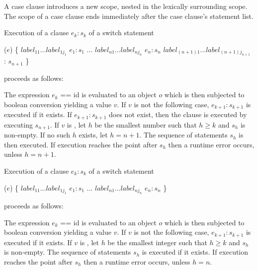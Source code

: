\documentclass{article}
\newcommand{\code}[1]{{\sf #1}}
\begin{document}
\begin{itemize}
\LMHash{}
A case clause introduces a new scope, nested in the lexically surrounding scope. The scope of a case clause ends immediately after the case clause's statement list.

\LMHash{}
Execution of a \CASE{} clause \CASE{} $e_{k}: s_{k}$ of a  switch statement

\begin{dartCode}
\SWITCH{} ($e$) \{
   $label_{11} \ldots label_{1j_1}$ \CASE{} $e_1: s_1$
   $\ldots$
   $label_{n1} \ldots label_{nj_n}$ \CASE{} $e_n: s_n$
   $label_{(n+1)1} \ldots label_{(n+1)j_{n+1}}$ \DEFAULT{}: $s_{n+1}$
\}
\end{dartCode}

proceeds as follows:

\LMHash{}
The expression \code{$e_k$ == id} is evaluated to an object $o$ which is then subjected to boolean conversion yielding a value $v$.
If $v$ is not  \TRUE{} the following case,  \CASE{} $e_{k+1}: s_{k+1}$ is executed if it exists. If  \CASE{} $e_{k+1}: s_{k+1}$ does not exist, then the \DEFAULT{} clause is executed by executing $s_{n+1}$.
If $v$ is \TRUE{},   let $h$ be the smallest number such that $h \ge k$ and $s_h$ is non-empty. If no such $h$ exists, let $h = n + 1$. The  sequence of statements $s_h$ is then executed.
If execution reaches the point after $s_h$  then  a runtime error occurs, unless $h = n+1$.

\LMHash{}
Execution of a \CASE{} clause \CASE{} $e_{k}: s_{k}$ of a  switch statement

\begin{dartCode}
\SWITCH{} ($e$) \{
   $label_{11} \ldots label_{1j_1}$ \CASE{} $e_1: s_1$
   $\ldots$
   $label_{n1} \ldots label_{nj_n}$ \CASE{} $e_n: s_n$
\}
\end{dartCode}

proceeds as follows:

\LMHash{}
The expression \code{$e_k$ == id} is evaluated to an object $o$ which is then subjected to boolean conversion yielding a value $v$.
If $v$ is not  \TRUE{} the following case,  \CASE{} $e_{k+1}: s_{k+1}$ is executed if it exists.
If $v$ is \TRUE{},   let $h$ be the smallest integer such that $h \ge k$ and $s_h$ is non-empty. The  sequence of statements $s_h$ is  executed if it exists.
If execution reaches the point after $s_h$  then  a runtime error occurs, unless $h = n$.




\end{itemize}
\end{document}
